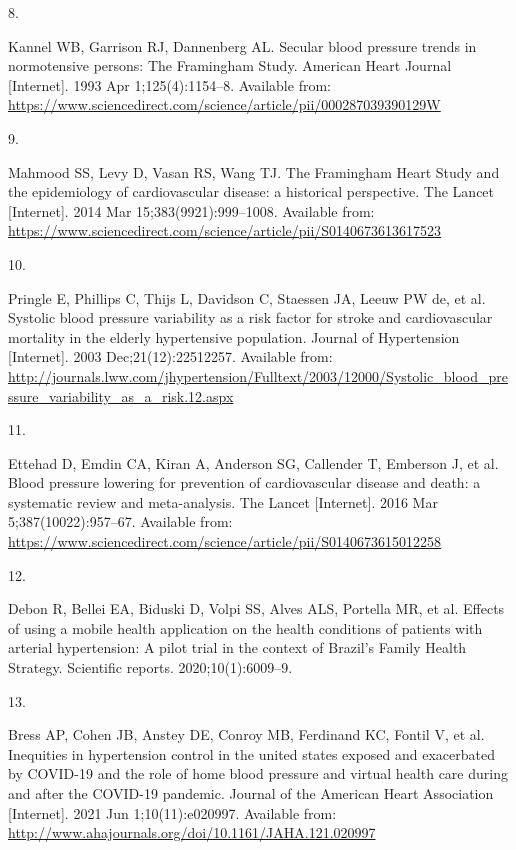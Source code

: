 \documentclass[
]{article}
\newlength{\cslhangindent}
\newlength{\csllabelwidth}
\newlength{\cslentryspacingunit} %
\newenvironment{CSLReferences}[2] %
 {%
  \setlength{\parindent}{0pt}
  \ifodd #1
  \let\oldpar\par
  \def\par{\hangindent=\cslhangindent\oldpar}
  \fi
  \setlength{\parskip}{#2\cslentryspacingunit}
 }%
 {}
\newcommand{\CSLLeftMargin}[1]{\parbox[t]{\csllabelwidth}{#1}}
\newcommand{\CSLRightInline}[1]{\parbox[t]{\linewidth - \csllabelwidth}{#1}\break}
\begin{document}
\begin{CSLReferences}{0}{0}
\leavevmode{}%
\CSLLeftMargin{8. }%
\CSLRightInline{Kannel WB, Garrison RJ, Dannenberg AL. Secular blood
pressure trends in normotensive persons: The Framingham Study. American
Heart Journal {[}Internet{]}. 1993 Apr 1;125(4):1154--8. Available from:
\url{https://www.sciencedirect.com/science/article/pii/000287039390129W}}

\leavevmode{}%
\CSLLeftMargin{9. }%
\CSLRightInline{Mahmood SS, Levy D, Vasan RS, Wang TJ. The Framingham
Heart Study and the epidemiology of cardiovascular disease: a historical
perspective. The Lancet {[}Internet{]}. 2014 Mar 15;383(9921):999--1008.
Available from:
\url{https://www.sciencedirect.com/science/article/pii/S0140673613617523}}

\leavevmode{}%
\CSLLeftMargin{10. }%
\CSLRightInline{Pringle E, Phillips C, Thijs L, Davidson C, Staessen JA,
Leeuw PW de, et al. Systolic blood pressure variability as a risk factor
for stroke and cardiovascular mortality in the elderly hypertensive
population. Journal of Hypertension {[}Internet{]}. 2003
Dec;21(12):22512257. Available from:
\url{http://journals.lww.com/jhypertension/Fulltext/2003/12000/Systolic_blood_pressure_variability_as_a_risk.12.aspx}}

\leavevmode{}%
\CSLLeftMargin{11. }%
\CSLRightInline{Ettehad D, Emdin CA, Kiran A, Anderson SG, Callender T,
Emberson J, et al. Blood pressure lowering for prevention of
cardiovascular disease and death: a systematic review and meta-analysis.
The Lancet {[}Internet{]}. 2016 Mar 5;387(10022):957--67. Available
from:
\url{https://www.sciencedirect.com/science/article/pii/S0140673615012258}}

\leavevmode{}%
\CSLLeftMargin{12. }%
\CSLRightInline{Debon R, Bellei EA, Biduski D, Volpi SS, Alves ALS,
Portella MR, et al. Effects of using a mobile health application on the
health conditions of patients with arterial hypertension: A pilot trial
in the context of Brazil's Family Health Strategy. Scientific reports.
2020;10(1):6009--9. }

\leavevmode{}%
\CSLLeftMargin{13. }%
\CSLRightInline{Bress AP, Cohen JB, Anstey DE, Conroy MB, Ferdinand KC,
Fontil V, et al. Inequities in hypertension control in the united states
exposed and exacerbated by COVID{-}19 and the role of home blood
pressure and virtual health care during and after the COVID{-}19
pandemic. Journal of the American Heart Association {[}Internet{]}. 2021
Jun 1;10(11):e020997. Available from:
\url{http://www.ahajournals.org/doi/10.1161/JAHA.121.020997}}


\end{CSLReferences}
\end{document}
